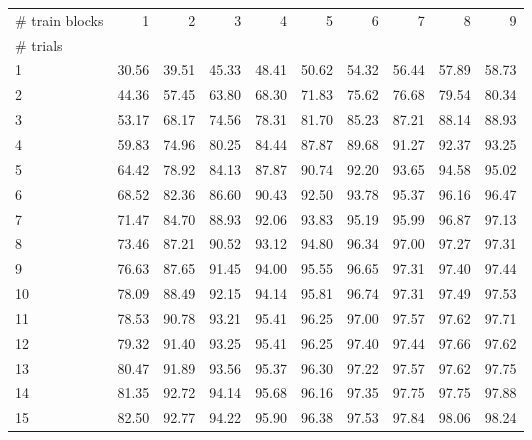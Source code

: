 \begin{tabularx}{\textwidth}{@{}Xrrrrrrrrr@{}}
\toprule
\# train blocks & 1 & 2 & 3 & 4 & 5 & 6 & 7 & 8 & 9 \\
\# trials &  &  &  &  &  &  &  &  &  \\
\midrule
1 & 30.56 & 39.51 & 45.33 & 48.41 & 50.62 & 54.32 & 56.44 & 57.89 & 58.73 \\
2 & 44.36 & 57.45 & 63.80 & 68.30 & 71.83 & 75.62 & 76.68 & 79.54 & 80.34 \\
3 & 53.17 & 68.17 & 74.56 & 78.31 & 81.70 & 85.23 & 87.21 & 88.14 & 88.93 \\
4 & 59.83 & 74.96 & 80.25 & 84.44 & 87.87 & 89.68 & 91.27 & 92.37 & 93.25 \\
5 & 64.42 & 78.92 & 84.13 & 87.87 & 90.74 & 92.20 & 93.65 & 94.58 & 95.02 \\
6 & 68.52 & 82.36 & 86.60 & 90.43 & 92.50 & 93.78 & 95.37 & 96.16 & 96.47 \\
7 & 71.47 & 84.70 & 88.93 & 92.06 & 93.83 & 95.19 & 95.99 & 96.87 & 97.13 \\
8 & 73.46 & 87.21 & 90.52 & 93.12 & 94.80 & 96.34 & 97.00 & 97.27 & 97.31 \\
9 & 76.63 & 87.65 & 91.45 & 94.00 & 95.55 & 96.65 & 97.31 & 97.40 & 97.44 \\
10 & 78.09 & 88.49 & 92.15 & 94.14 & 95.81 & 96.74 & 97.31 & 97.49 & 97.53 \\
11 & 78.53 & 90.78 & 93.21 & 95.41 & 96.25 & 97.00 & 97.57 & 97.62 & 97.71 \\
12 & 79.32 & 91.40 & 93.25 & 95.41 & 96.25 & 97.40 & 97.44 & 97.66 & 97.62 \\
13 & 80.47 & 91.89 & 93.56 & 95.37 & 96.30 & 97.22 & 97.57 & 97.62 & 97.75 \\
14 & 81.35 & 92.72 & 94.14 & 95.68 & 96.16 & 97.35 & 97.75 & 97.75 & 97.88 \\
15 & 82.50 & 92.77 & 94.22 & 95.90 & 96.38 & 97.53 & 97.84 & 98.06 & 98.24 \\
\bottomrule
\end{tabularx}
